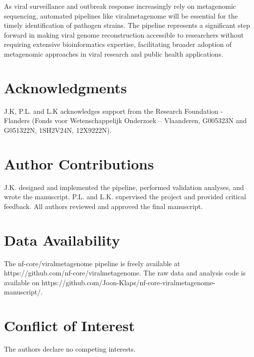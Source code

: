 As viral surveillance and outbreak response increasingly rely on metagenomic sequencing, automated pipelines like viralmetagenome will be essential for the timely identification of pathogen strains. The pipeline represents a significant step forward in making viral genome reconstruction accessible to researchers without requiring extensive bioinformatics expertise, facilitating broader adoption of metagenomic approaches in viral research and public health applications.


\section*{Acknowledgments}
 J.K, P.L. and L.K  acknowledges support from the Research Foundation - Flanders (Fonds voor Wetenschappelijk Onderzoek – Vlaanderen, G005323N and G051322N, 1SH2V24N, 12X9222N).

\section*{Author Contributions}
J.K. designed and implemented the pipeline, performed validation analyses, and wrote the manuscript. P.L. and L.K. supervised the project and provided critical feedback. All authors reviewed and approved the final manuscript.

\section*{Data Availability}
The nf-core/viralmetagenome pipeline is freely available at https://github.com/nf-core/viralmetagenome.
The raw data and analysis code is available on https://github.com/Joon-Klaps/nf-core-viralmetagenome-manuscript/.

\section*{Conflict of Interest}
The authors declare no competing interests.

